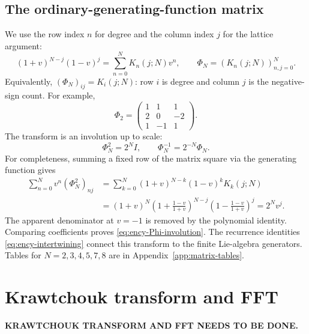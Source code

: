 \subsection{The ordinary-generating-function matrix}
\label{sec:matrix-Phi-definition}
We use the row index $n$ for degree and the column index $j$ for
the lattice argument:
\begin{equation}\label{eq:ency-Phi-generating}
(1+v)^{N-j}(1-v)^j
=\sum_{n=0}^N K_n(j;N)v^n,\qquad
\Phi_N=(K_n(j;N))_{n,j=0}^N.
\end{equation}
Equivalently, $(\Phi_N)_{ij}=K_i(j;N)$: row $i$ is degree and column $j$ is the negative-sign count.
For example,
\[
\Phi_2=\begin{pmatrix}1&1&1\\2&0&-2\\1&-1&1\end{pmatrix}.
\]
The transform is an involution up to scale:
\begin{equation}\label{eq:ency-Phi-involution}
\Phi_N^2=2^NI,\qquad \Phi_N^{-1}=2^{-N}\Phi_N.
\end{equation}
For completeness, summing a fixed row of the matrix square via the
generating function gives
\begin{align*}
\sum_{n=0}^N v^n(\Phi_N^2)_{nj}
&=\sum_{k=0}^N(1+v)^{N-k}(1-v)^kK_k(j;N)\\
&=(1+v)^N\left(1+\frac{1-v}{1+v}\right)^{N-j}
\left(1-\frac{1-v}{1+v}\right)^j
=2^Nv^j.
\end{align*}
The apparent denominator at $v=-1$ is removed by the polynomial
identity. Comparing coefficients proves
\eqref{eq:ency-Phi-involution}.
The recurrence identities \eqref{eq:ency-intertwining} connect this
transform to the finite Lie-algebra generators. Tables for
$N=2,3,4,5,7,8$ are in Appendix~\ref{app:matrix-tables}.

\section{Krawtchouk transform and FFT}
\label{sec:14-4}

\noindent\textbf{KRAWTCHOUK TRANSFORM AND FFT NEEDS TO BE DONE.}


